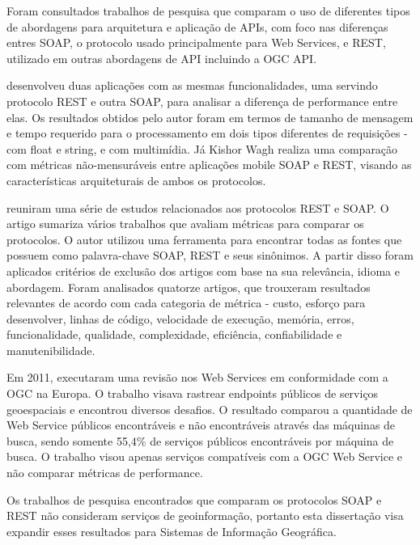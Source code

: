 Foram consultados trabalhos de pesquisa que comparam o uso de diferentes tipos de abordagens para arquitetura e aplicação de APIs, com foco nas diferenças entres SOAP, o protocolo usado principalmente para Web Services, e REST, utilizado em outras abordagens de API incluindo a OGC API.  %

\cite{mumbaikar2013web} desenvolveu duas aplicações com as mesmas funcionalidades, uma servindo protocolo REST e outra SOAP, para analisar a diferença de performance entre elas. Os resultados obtidos pelo autor foram em termos de tamanho de mensagem e tempo requerido para o processamento em dois tipos diferentes de requisições - com float e string, e com multimídia. Já Kishor Wagh \cite{wagh2012comparative} realiza uma comparação com métricas não-mensuráveis entre aplicações mobile SOAP e REST, visando as características arquiteturais de ambos os protocolos.

\citep{tihomirovs2016comparison} reuniram uma série de estudos relacionados aos protocolos REST e SOAP. O artigo sumariza vários trabalhos que avaliam métricas para comparar os protocolos. O autor utilizou uma ferramenta para encontrar todas as fontes que possuem como palavra-chave SOAP, REST e seus sinônimos. A partir disso foram aplicados critérios de exclusão dos artigos com base na sua relevância, idioma e abordagem. Foram analisados quatorze artigos, que trouxeram resultados relevantes de acordo com cada categoria de métrica - custo, esforço para desenvolver, linhas de código, velocidade de execução, memória, erros, funcionalidade, qualidade, complexidade, eficiência, confiabilidade e manutenibilidade.  

Em 2011, \citep{lopez2011review} executaram uma revisão nos Web Services em conformidade com a OGC na Europa.  O trabalho visava rastrear endpoints públicos de serviços geoespaciais e encontrou diversos desafios. O resultado comparou a quantidade de Web Service públicos encontráveis e não encontráveis através das máquinas de busca, sendo somente 55,4\% de serviços públicos encontráveis por máquina de busca. O trabalho visou apenas serviços compatíveis com a OGC Web Service e não comparar métricas de performance.

Os trabalhos de pesquisa encontrados que comparam os protocolos SOAP e REST não consideram serviços de geoinformação, portanto esta dissertação visa expandir esses resultados para Sistemas de Informação Geográfica. %